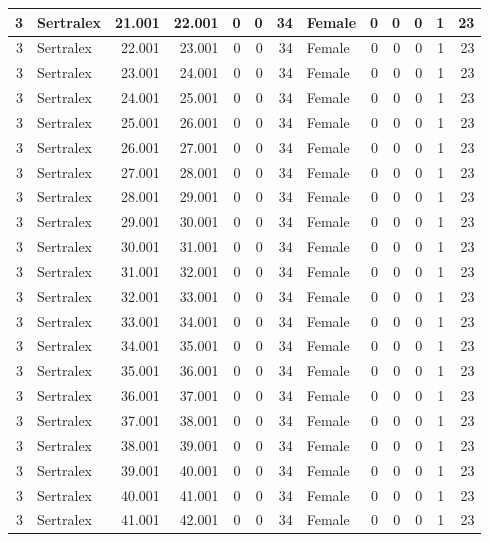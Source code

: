 \documentclass[
]{book}
\begin{document}
\begin{table}
\begin{tabular}[t]{r|l|r|r|r|r|r|l|r|r|r|r|r}
\hline
3 & Sertralex & 21.001 & 22.001 & 0 & 0 & 34 & Female & 0 & 0 & 0 & 1 & 23\\
\hline
3 & Sertralex & 22.001 & 23.001 & 0 & 0 & 34 & Female & 0 & 0 & 0 & 1 & 23\\
\hline
3 & Sertralex & 23.001 & 24.001 & 0 & 0 & 34 & Female & 0 & 0 & 0 & 1 & 23\\
\hline
3 & Sertralex & 24.001 & 25.001 & 0 & 0 & 34 & Female & 0 & 0 & 0 & 1 & 23\\
\hline
3 & Sertralex & 25.001 & 26.001 & 0 & 0 & 34 & Female & 0 & 0 & 0 & 1 & 23\\
\hline
3 & Sertralex & 26.001 & 27.001 & 0 & 0 & 34 & Female & 0 & 0 & 0 & 1 & 23\\
\hline
3 & Sertralex & 27.001 & 28.001 & 0 & 0 & 34 & Female & 0 & 0 & 0 & 1 & 23\\
\hline
3 & Sertralex & 28.001 & 29.001 & 0 & 0 & 34 & Female & 0 & 0 & 0 & 1 & 23\\
\hline
3 & Sertralex & 29.001 & 30.001 & 0 & 0 & 34 & Female & 0 & 0 & 0 & 1 & 23\\
\hline
3 & Sertralex & 30.001 & 31.001 & 0 & 0 & 34 & Female & 0 & 0 & 0 & 1 & 23\\
\hline
3 & Sertralex & 31.001 & 32.001 & 0 & 0 & 34 & Female & 0 & 0 & 0 & 1 & 23\\
\hline
3 & Sertralex & 32.001 & 33.001 & 0 & 0 & 34 & Female & 0 & 0 & 0 & 1 & 23\\
\hline
3 & Sertralex & 33.001 & 34.001 & 0 & 0 & 34 & Female & 0 & 0 & 0 & 1 & 23\\
\hline
3 & Sertralex & 34.001 & 35.001 & 0 & 0 & 34 & Female & 0 & 0 & 0 & 1 & 23\\
\hline
3 & Sertralex & 35.001 & 36.001 & 0 & 0 & 34 & Female & 0 & 0 & 0 & 1 & 23\\
\hline
3 & Sertralex & 36.001 & 37.001 & 0 & 0 & 34 & Female & 0 & 0 & 0 & 1 & 23\\
\hline
3 & Sertralex & 37.001 & 38.001 & 0 & 0 & 34 & Female & 0 & 0 & 0 & 1 & 23\\
\hline
3 & Sertralex & 38.001 & 39.001 & 0 & 0 & 34 & Female & 0 & 0 & 0 & 1 & 23\\
\hline
3 & Sertralex & 39.001 & 40.001 & 0 & 0 & 34 & Female & 0 & 0 & 0 & 1 & 23\\
\hline
3 & Sertralex & 40.001 & 41.001 & 0 & 0 & 34 & Female & 0 & 0 & 0 & 1 & 23\\
\hline
3 & Sertralex & 41.001 & 42.001 & 0 & 0 & 34 & Female & 0 & 0 & 0 & 1 & 23\\

\end{tabular}
\end{table}
\end{document}
